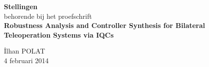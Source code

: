 \documentclass[10pt]{article}%
\begin{document}


\vspace*{1.5cm}
\begin{center}
{\LARGE \bfseries Stellingen}\\[5mm]
{\Large behorende bij het proefschrift}\\[2cm]

{\LARGE \bfseries Robustness Analysis and Controller Synthesis for Bilateral Teleoperation Systems via IQCs}\\[4mm]
\vspace{2cm}

{\Large \.Ilhan POLAT \\[1cm]
4 februari 2014}
\end{center}

\newpage
\end{document}
